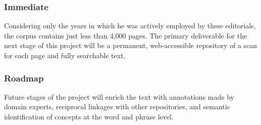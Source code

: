 \subsubsection{Immediate}
Considering only the years in which he was actively employed by these editorials, the corpus contains just less than 4,000 pages. The primary deliverable for the next stage of this project will be a permanent, web-accessible repository of a scan for each page and fully searchable text.



\subsubsection{Roadmap}
Future stages of the project will enrich the text with annotations made by domain experts, reciprocal linkages with other repositories, and semantic identification of concepts at the word and phrase level.